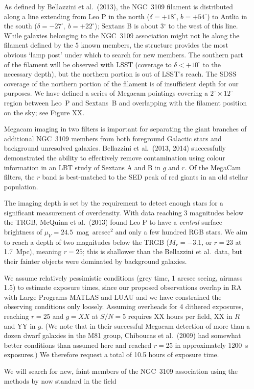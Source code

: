 As defined by Bellazzini et al.\ (2013), the NGC~3109 filament is  distributed along a line extending from Leo P in the north ($\delta = +18^{\circ}$, $b = +54^{\circ}$) to
Antlia in the south ($\delta = -27^{\circ}$, $b = +22^{\circ}$); Sextans B is about 3$^{\circ}$ to the west of this line.
While galaxies belonging to the NGC~3109 association might not lie along the filament defined by
the 5 known members, the structure provides the most obvious `lamp post' under which to search for new
members. The southern part of the filament will be observed with LSST (coverage to $\delta < +10^{\circ}$ to the necessary depth),
but the northern portion is out of LSST's reach. The SDSS coverage of the northern portion of the filament
is of insufficient depth for our purposes.
We have defined a series of Megacam pointings covering a $2^{\circ}\times12^{\circ}$ region between 
Leo~P and Sextans~B and overlapping with the filament position on the sky; see Figure XX.

Megacam imaging in two filters is important for separating the giant branches of additional NGC~3109
members from both foreground Galactic stars and background unresolved galaxies.  Bellazzini et al.\ (2013, 2014)
successfully demonstrated the ability to effectively remove contamination using colour information
in an LBT study of Sextans A and B in $g$ and $r$. Of the MegaCam filters, the $r$ band is best-matched to the SED 
peak of red giants in an old stellar population.

The imaging depth is set by the requirement to detect enough stars for a significant measurement of overdensity. 
With data reaching 3 magnitudes below the TRGB, McQuinn et al.\ (2013) found Leo P to have a {\em central} surface brightness 
of $\mu_V=24.5$~mag~arcsec$^2$ and only a few hundred RGB stars. We aim to reach 
a depth of two magnitudes below the TRGB ($M_r = -3.1$, or  $r=23$ at 1.7~Mpc), meaning $r=25$;
this is shallower than the Bellazzini et al.\  data, but their fainter objects were dominated by background galaxies. 

We assume relatively  pessimistic conditions (grey time, 1 arcsec seeing, airmass 1.5) to estimate exposure times,
since our proposed observations  overlap in RA with Large Programs MATLAS and LUAU and we have constrained the observing
conditions only loosely. Assuming overheads for 4 dithered exposures, reaching 
$r=25$ and $g=XX$ at $S/N=5$ requires XX hours per field, XX in $R$ and YY in $g$.
(We note that in their successful Megacam detection of more than a 
dozen dwarf galaxies in the M81 group, Chiboucas et al.\ (2009) had somewhat
better conditions than assumed here and reached $r=25$ in approximately 1200~s exposures.)
We therefore request a total of 10.5 hours of exposure time.

We will search for new, faint members of the NGC~3109 association using the methods by now standard in the field
